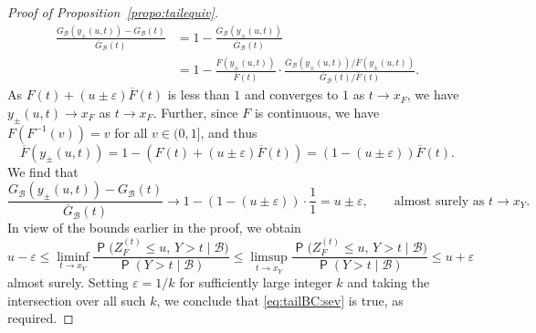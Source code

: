 \documentclass[12pt]{article}
\newcommand{\Q}{\operatorname{\mathsf{P}}}
\newcommand{\Bb}{\mathcal{B}}
\newcommand{\1}{\mathbf{1}} %
\newcommand{\eps}{\varepsilon}
\newcommand{\Fbar}{\overline{F}}
\newcommand{\GB}{G_{\Bb}}
\newcommand{\GBbar}{\overline{G}_{\Bb}}
\newcommand{\ZFt}{Z_{F}^{(t)}} %
\theoremstyle{definition}
\begin{document}
\begin{proof}[Proof of Proposition~\ref{propo:tailequiv}]
\begin{align*}
		\frac{\GB(y_\pm(u,t)) - \GB(t)}{\GBbar(t)}
		&= 1 - \frac{\GBbar(y_\pm(u,t))}{\GBbar(t)} \\
		&= 1 - \frac{\Fbar(y_\pm(u,t))}{\Fbar(t)} \cdot \frac{\GBbar(y_\pm(u,t))/\Fbar(y_\pm(u,t))}{\GBbar(t)/\Fbar(t)}.
	\end{align*}
	As $F(t) + (u \pm \eps) \Fbar(t)$ is less than $1$ and converges to $1$ as $t \to x_F$, we have $y_\pm(u,t) \to x_F$ as $t \to x_F$. Further, since $F$ is continuous, we have $F(F^{-1}(v)) = v$ for all $v \in (0, 1]$, and thus
	\[
	\Fbar(y_{\pm}(u,t)) 
	= 1 - \left(F(t) + (u\pm\eps) \Fbar(t)\right)
	= (1 - (u \pm \eps)) \Fbar(t).
	\]
	We find that
	\[
	\frac{\GB(y_\pm(u,t)) - \GB(t)}{\GBbar(t)}
	\to 1 - (1 - (u \pm \eps)) \cdot \frac{1}{1} 
	= u \pm \eps,
	\qquad \text{almost surely as $t \to x_Y$.}
	\]
	In view of the bounds earlier in the proof, we obtain
	\[
	u - \eps
	\le \liminf_{t \to x_Y}
	\frac{\Q\bigl( \ZFt \le u, \, Y > t \mid \Bb \bigr)}{\Q(Y > t \mid \Bb)}
	\le \limsup_{t \to x_Y}
	\frac{\Q\bigl( \ZFt \le u, \, Y > t \mid \Bb \bigr)}{\Q(Y > t \mid \Bb)}
	\le u+\eps
	\]
	almost surely. Setting $\eps = 1/k$ for sufficiently large integer $k$ and taking the intersection over all such $k$, we conclude that \eqref{eq:tailBC:sev} is true, as required.
\end{proof}
\end{document}
